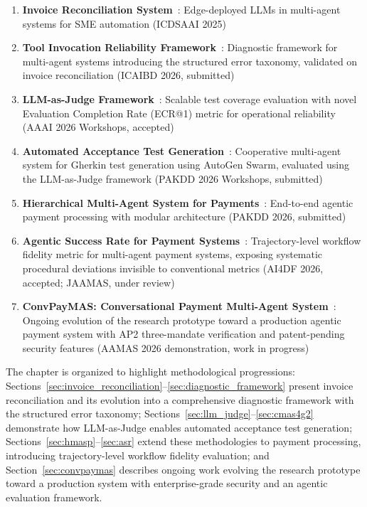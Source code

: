 \begin{enumerate}[leftmargin=*]
    \item \textbf{Invoice Reconciliation System}~\cite{huang2025invoice}: Edge-deployed LLMs in multi-agent systems for SME automation (ICDSAAI 2025)
    \item \textbf{Tool Invocation Reliability Framework}~\cite{huang2026when}: Diagnostic framework for multi-agent systems introducing the structured error taxonomy, validated on invoice reconciliation (ICAIBD 2026, submitted)
    \item \textbf{LLM-as-Judge Framework}~\cite{huang2026judge}: Scalable test coverage evaluation with novel Evaluation Completion Rate (ECR@1) metric for operational reliability (AAAI 2026 Workshops, accepted)
    \item \textbf{Automated Acceptance Test Generation}~\cite{huang2026open}: Cooperative multi-agent system for Gherkin test generation using AutoGen Swarm, evaluated using the LLM-as-Judge framework (PAKDD 2026 Workshops, submitted)
    \item \textbf{Hierarchical Multi-Agent System for Payments}~\cite{huang2026hmasp}: End-to-end agentic payment processing with modular architecture (PAKDD 2026, submitted)
    \item \textbf{Agentic Success Rate for Payment Systems}~\cite{huang2026asr,huang2026asrjournal}: Trajectory-level workflow fidelity metric for multi-agent payment systems, exposing systematic procedural deviations invisible to conventional metrics (AI4DF 2026, accepted; JAAMAS, under review)
    \item \textbf{ConvPayMAS: Conversational Payment Multi-Agent System}~\cite{chua2026convpaymas}: Ongoing evolution of the research prototype toward a production agentic payment system with AP2 three-mandate verification and patent-pending security features (AAMAS 2026 demonstration, work in progress)
\end{enumerate}

The chapter is organized to highlight methodological progressions: Sections~\ref{sec:invoice_reconciliation}--\ref{sec:diagnostic_framework} present invoice reconciliation and its evolution into a comprehensive diagnostic framework with the structured error taxonomy; Sections~\ref{sec:llm_judge}--\ref{sec:cmas4g2} demonstrate how LLM-as-Judge enables automated acceptance test generation; Sections~\ref{sec:hmasp}--\ref{sec:asr} extend these methodologies to payment processing, introducing trajectory-level workflow fidelity evaluation; and Section~\ref{sec:convpaymas} describes ongoing work evolving the research prototype toward a production system with enterprise-grade security and an agentic evaluation framework.

